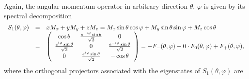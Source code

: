 \documentclass[fleqn,twoside]{article}      %
\begin{document}
Again, the angular momentum operator in arbitrary direction $\theta$, $\varphi$ is given by its spectral decomposition
\begin{equation}
\begin{array}{rcl}
S_1 (\theta ,\varphi) &=&
xM_x
+
yM_y
+
zM_z
=
 M_x  \sin \theta \cos \varphi
+
M_y   \sin \theta \sin \varphi
+
M_z   \cos \theta
\\
&=&   \left(
\begin{array}{cccc}
\cos \theta & {e^{-i\varphi}\sin \theta \over \sqrt{2}}& 0      \\
{e^{i\varphi}\sin \theta \over \sqrt{2}}& 0
& {e^{-i\varphi}\sin \theta \over \sqrt{2}}      \\
0& {e^{i\varphi}\sin \theta \over \sqrt{2}}& -\cos \theta
\end{array}\right)
= -F_{-}(\theta ,\varphi)+0\cdot F_0(\theta ,\varphi) +F_{+}(\theta ,\varphi),
\end{array}
\label{e-2009-gtq-s3}
\end{equation}
where the orthogonal projectors associated with the eigenstates of $S_1 (\theta ,\varphi)$ are
\end{document}
